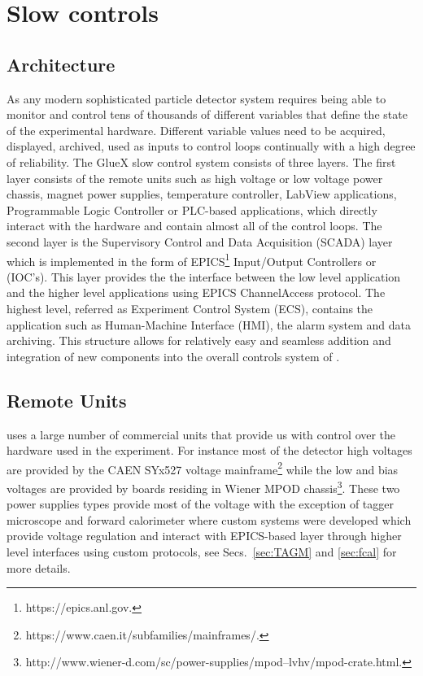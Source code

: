 
\section[Slow controls (Hovanes)]{Slow controls \label{sec:controls}}
\subsection{Architecture \label{sec:controlsarchitechture}}
As any modern sophisticated particle detector system \gx{} requires being able to monitor 
and control tens of thousands of different variables that define the state of the experimental hardware. Different variable values need to be acquired, displayed, archived, used as inputs to control loops continually with a high degree of reliability. The GlueX slow control system consists of three layers. The first layer consists of the remote units such as high voltage or low voltage power chassis, magnet power supplies, temperature controller, LabView applications, Programmable Logic Controller or PLC-based applications, which directly interact with the hardware and contain almost all of the control loops. The second layer is the Supervisory Control and Data Acquisition (SCADA) layer which is implemented in the form of EPICS\footnote{https://epics.anl.gov.} Input/Output Controllers or (IOC's). This layer provides the the interface between the low level application and the higher level applications using EPICS ChannelAccess protocol. The highest level, referred as Experiment Control System (ECS), contains the application such as Human-Machine Interface (HMI), the alarm system and data archiving. This structure allows for relatively easy and seamless addition and integration of new components into the overall controls system of \gx{}.    

\subsection{Remote Units \label{sec:controlsinterface}}
\gx{} uses a large number of commercial units that provide us with control over the hardware used in the experiment. For instance most of the detector high voltages are provided by the CAEN SYx527 voltage mainframe\footnote{https://www.caen.it/subfamilies/mainframes/.} while the low and bias voltages are provided by boards residing in Wiener MPOD chassis\footnote{http://www.wiener-d.com/sc/power-supplies/mpod--lvhv/mpod-crate.html.}. These two power supplies types provide most of the voltage with the exception of tagger microscope and forward calorimeter where custom systems were developed which provide voltage regulation and interact with EPICS-based layer through higher level interfaces using custom protocols, see Secs.~\ref{sec:TAGM} and \ref{sec:fcal} for more details.  

